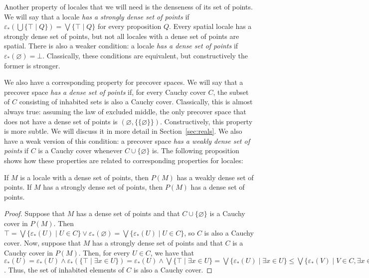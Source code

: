 \documentclass[reqno]{amsart}
\theoremstyle{definition}
\theoremstyle{remark}
\numberwithin{figure}{section}
\begin{document}
Another property of locales that we will need is the denseness of its set of points.
We will say that a locale \emph{has a strongly dense set of points} if $\varepsilon_*(\bigcup \{ \top \mid Q \}) = \bigvee \{ \top \mid Q \}$ for every proposition $Q$.
Every spatial locale has a strongly dense set of points, but not all locales with a dense set of points are spatial.
There is also a weaker condition: a locale \emph{has a dense set of points} if $\varepsilon_*(\varnothing) = \bot$.
Classically, these conditions are equivalent, but constructively the former is stronger.

We also have a corresponding property for precover spaces.
We will say that a precover space \emph{has a dense set of points} if, for every Cauchy cover $C$, the subset of $C$ consisting of inhabited sets is also a Cauchy cover.
Classically, this is almost always true: assuming the law of excluded middle, the only precover space that does not have a dense set of points is $(\varnothing, \{ \{ \varnothing \} \})$.
Constructively, this property is more subtle.
We will discuss it in more detail in Section~\ref{sec:reals}.
We also have a weak version of this condition: a precover space \emph{has a weakly dense set of points} if $C$ is a Cauchy cover whenever $C \cup \{ \varnothing \}$ is.
The following proposition shows how these properties are related to corresponding properties for locales:

\begin{prop}
If $M$ is a locale with a dense set of points, then $P(M)$ has a weakly dense set of points.
If $M$ has a strongly dense set of points, then $P(M)$ has a dense set of points.
\end{prop}
\begin{proof}
Suppose that $M$ has a dense set of points and that $C \cup \{ \varnothing \}$ is a Cauchy cover in $P(M)$.
Then $\top = \bigvee \{ \varepsilon_*(U) \mid U \in C \} \vee \varepsilon_*(\varnothing) = \bigvee \{ \varepsilon_*(U) \mid U \in C \}$, so $C$ is also a Cauchy cover.
Now, suppose that $M$ has a strongly dense set of points and that $C$ is a Cauchy cover in $P(M)$.
Then, for every $U \in C$, we have that $\varepsilon_*(U) = \varepsilon_*(U) \wedge \varepsilon_*(\{ \top \mid \exists x \in U \}) = \varepsilon_*(U) \wedge \bigvee \{ \top \mid \exists x \in U \} = \bigvee \{ \varepsilon_*(U) \mid \exists x \in U \} \leq \bigvee \{ \varepsilon_*(V) \mid V \in C, \exists x \in V \}$.
Thus, the set of inhabited elements of $C$ is also a Cauchy cover.
\end{proof}
\end{document}
